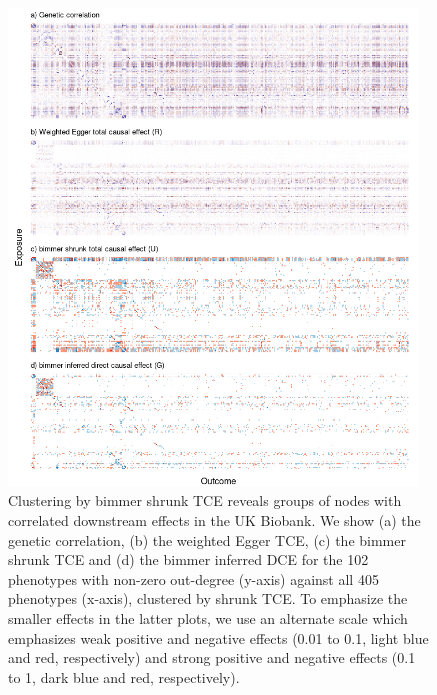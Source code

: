 \documentclass{article}
\begin{document}
\begin{figure}
\includegraphics[width=0.97\textwidth]{figures/figure5.png}
\caption{Clustering by bimmer shrunk TCE reveals groups of nodes with correlated downstream effects in the
UK Biobank. We show (a) the genetic correlation, (b) the weighted Egger TCE, (c) the bimmer shrunk
TCE and (d) the bimmer inferred DCE for the 102 phenotypes with non-zero out-degree (y-axis)
against all 405 phenotypes (x-axis), clustered by shrunk TCE. To emphasize the smaller effects
in the latter plots, we use an alternate scale which emphasizes weak positive and negative effects
(0.01 to 0.1, light blue and red, respectively) and strong positive and negative effects
(0.1 to 1, dark blue and red, respectively).}
\label{figure5}
\end{figure}
\end{document}
